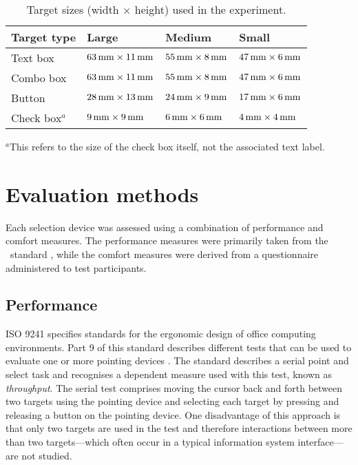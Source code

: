 \documentclass[reviewcopy]{elsart}
\begin{document}
\begin{table}[ht]
	\caption{Target sizes (width \(\times\) height) used in the experiment.}
	\label{tab-target-sizes}
	\begin{tabular}{llll}
		\hline
		\textbf{Target type}	&	\textbf{Large}							&	\textbf{Medium}							&	\textbf{Small}	\\
		\hline
		Text box				&	\(\unit[63]{mm} \times \unit[11]{mm}\)	&	\(\unit[55]{mm} \times \unit[8]{mm}\)	&	\(\unit[47]{mm} \times \unit[6]{mm}\)	\\
		Combo box				&	\(\unit[63]{mm} \times \unit[11]{mm}\)	&	\(\unit[55]{mm} \times \unit[8]{mm}\)	&	\(\unit[47]{mm} \times \unit[6]{mm}\)	\\
		Button					&	\(\unit[28]{mm} \times \unit[13]{mm}\)	&	\(\unit[24]{mm} \times \unit[9]{mm}\)	&	\(\unit[17]{mm} \times \unit[6]{mm}\)	\\
		Check box\(^{a}\)		&	\(\unit[9]{mm} \times \unit[9]{mm}\)	&	\(\unit[6]{mm} \times \unit[6]{mm}\)	&	\(\unit[4]{mm} \times \unit[4]{mm}\)	\\
		\hline
	\end{tabular}
	
	{\footnotesize \(^{a}\)This refers to the size of the check box itself, not the associated text label.}
\end{table}


\section{Evaluation methods}
\label{sec-evaluation}

Each selection device was assessed using a combination of performance
and comfort measures. The performance measures were primarily taken from
the \ISOnine\ standard \citep{ISO-2000-9241-9}, while the comfort
measures were derived from a questionnaire administered to test
participants.


\subsection{Performance}
\label{sec-evaluation-performance}

ISO 9241 specifies standards for the ergonomic design of office
computing environments. Part 9 of this standard describes different
tests that can be used to evaluate one or more pointing devices
\citep{ISO-2000-9241-9}. The standard describes a serial point and
select task and recognises a dependent measure used with this test,
known as \emph{throughput}. The serial test comprises moving the cursor
back and forth between two targets using the pointing device and
selecting each target by pressing and releasing a button on the pointing
device. One disadvantage of this approach is that only two targets are
used in the test and therefore interactions between more than two
targets---which often occur in a typical information system
interface---are not studied.
\end{document}
